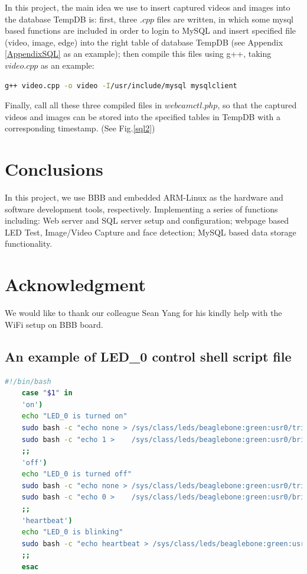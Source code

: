 \documentclass[12pt,journal,draftclsnofoot,onecolumn]{IEEEtran}
\begin{document}
In this project, the main idea we use to insert captured videos and images into the database TempDB is: first, three $.cpp$ files are written, in which some mysql based functions are included in order to login to MySQL \cite{MySQL} and insert specified file (video, image, edge) into the right table of database TempDB (see Appendix \ref{AppendixSQL} as an example); then compile this files using g++, taking $video.cpp$ as an example:

\begin{lstlisting}[language={bash}]
g++ video.cpp -o video -I/usr/include/mysql mysqlclient
\end{lstlisting}
Finally, call all these three compiled files in $webcamctl.php$, so that the captured videos and images can be stored into the specified tables in TempDB with a corresponding timestamp. (See Fig.\ref{sql2})

\section{Conclusions}\label{Con}
In this project, we use BBB and embedded ARM-Linux as the hardware and software development tools, respectively. Implementing a series of functions including: Web server and SQL server setup and configuration; webpage based LED Test, Image/Video Capture and face detection;  MySQL based data storage functionality.

\section*{Acknowledgment}
We would like to thank our colleague Sean Yang  for his kindly help with the WiFi setup on BBB board.



\clearpage

\appendix
    \subsection{An example of LED\_0 control shell script file}\label{AppendixLED}
    \begin{lstlisting}[language={bash}]
    #!/bin/bash
    case "$1" in
    'on')
    echo "LED_0 is turned on"
    sudo bash -c "echo none > /sys/class/leds/beaglebone:green:usr0/trigger"
    sudo bash -c "echo 1 >    /sys/class/leds/beaglebone:green:usr0/brightness"
    ;;
    'off')
    echo "LED_0 is turned off"
    sudo bash -c "echo none > /sys/class/leds/beaglebone:green:usr0/trigger"
    sudo bash -c "echo 0 >    /sys/class/leds/beaglebone:green:usr0/brightness"
    ;;
    'heartbeat')
    echo "LED_0 is blinking"
    sudo bash -c "echo heartbeat > /sys/class/leds/beaglebone:green:usr0/trigger"
    ;;
    esac
    \end{lstlisting}
    
\end{document}
